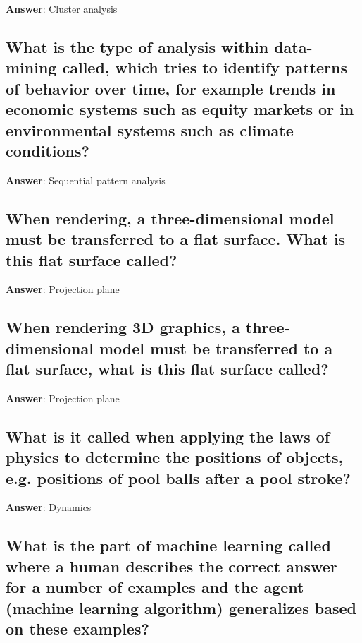 \documentclass[a4paper,11pt,oneside]{article}
\begin{document}
\begin{sloppypar}
\label{q:57:sa:en:True}

\textbf{Answer}: Cluster analysis



\subsection{What is the type of analysis within data-mining called, which tries to identify patterns of behavior over time, for example trends in economic systems such as equity markets or in environmental systems such as climate conditions?}

\label{q:58:sa:en:True}

\textbf{Answer}: Sequential pattern analysis



\subsection{When rendering, a three-dimensional model must be transferred to a flat surface. What is this flat surface called?}

\label{q:59:sa:en:True}

\textbf{Answer}: Projection plane



\subsection{When rendering 3D graphics, a three-dimensional model must be transferred to a flat surface, what is this flat surface called?}

\label{q:60:sa:en:True}

\textbf{Answer}: Projection plane



\subsection{What is it called when applying the laws of physics to determine the positions of objects, e.g. positions of pool balls after a pool stroke?}

\label{q:61:sa:en:True}

\textbf{Answer}: Dynamics



\subsection{What is the part of machine learning called where a human describes the correct answer for a number of examples and the agent (machine learning algorithm) generalizes based on these examples?}


\end{sloppypar}
\end{document}
